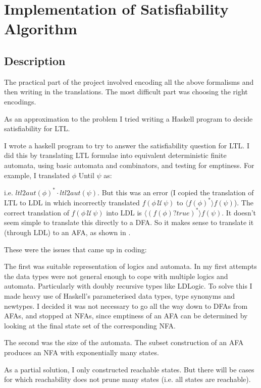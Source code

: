
\clearpage
\section {Implementation of Satisfiability Algorithm}
\subsection{Description}

The practical part of the project involved encoding all the above formalisms
and then writing in the translations.
The most difficult part was choosing the right encodings.

As an approximation to the problem I tried writing a Haskell program to decide satisfiability for LTL.

I wrote a haskell program to try to answer the satisfiability question for LTL.
I did this by translating LTL formulae into equivalent deterministic finite automata,
using basic automata and combinators, and testing for emptiness.
For example, I translated $\phi$ Until $\psi$ as:

i.e. $ ltl2aut(\phi)^* \cdot ltl2aut(\psi) $.
But this was an error (I copied the translation of LTL to LDL in \cite{ldlf} which incorrectly translated $ f(\phi \, \mathcal{U} \, \psi) $ to $\langle f(\phi)^* \rangle f(\psi)$).
The correct translation of $ f(\phi \, \mathcal{U} \, \psi) $ into LDL is $\langle (f(\phi)?true)^* \rangle f(\psi)$. It doesn't seem simple to translate this directly to a DFA. So it makes sense to translate it (through LDL) to an AFA, as shown in \cite{ldlf}.

These were the issues that came up in coding:

The first was suitable representation of logics and automata.
In my first attempts the data types were not general enough
to cope with multiple logics and automata.
Particularly with doubly recursive types like LDLogic.
To solve this I made heavy use of Haskell's parameterised data types,
type synonyms and newtypes.
I decided it was not necessary to go all the way down to DFAs from
AFAs, and stopped at NFAs, since
emptiness of an AFA can be determined by looking at
the final state set of the corresponding NFA.

The second was the size of the automata.
The subset construction of an AFA produces an
NFA with exponentially many states.

As a partial solution, I only constructed reachable states.
But there will be cases for which reachability does not prune many states
(i.e. all states are reachable).



